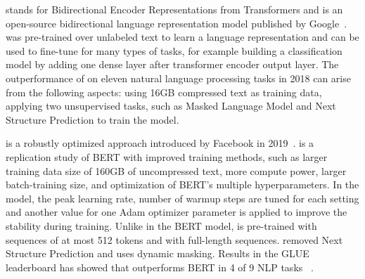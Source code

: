 \Bert stands for Bidirectional Encoder Representations from Transformers and is an open-source bidirectional language representation model published by Google~\cite{DevlinCLT2019}. 
\Bert was pre-trained over unlabeled text to learn a language representation and can be used to fine-tune for many types of tasks, for example building a classification model by adding one dense layer after transformer encoder output layer. 
The outperformance of \Bert on eleven natural language processing tasks in 2018 can arise from the following aspects: using 16GB compressed text as training data, applying two unsupervised tasks, such as Masked Language Model and Next Structure Prediction to train the \Bert model.

\Roberta is a robustly optimized \Bert approach introduced by Facebook in 2019~\cite{LiuOGDJCLLZS2019}. 
\Roberta is a replication study of BERT with improved training methods, such as larger training data size of 160GB of uncompressed text, more compute power, larger batch-training size, and optimization of BERT’s multiple hyperparameters. 
In the \Roberta model, the peak learning rate, number of warmup steps are tuned for each setting and another value for one Adam optimizer parameter is applied to improve the stability during training. 
Unlike in the BERT model, \Roberta is pre-trained with sequences of at most 512 tokens and with full-length sequences. 
\Roberta removed Next Structure Prediction and uses dynamic masking. 
Results in the GLUE leaderboard has showed that \Roberta outperforms BERT in 4 of 9 NLP tasks ~\cite{LiuOGDJCLLZS2019}.

